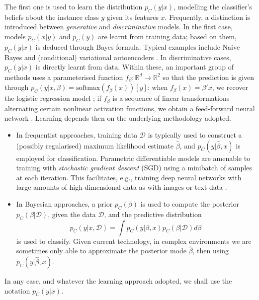 The first one is used to learn the distribution $p_C(y|x)$, modelling the classifier's beliefs about the  instance class $y$ given its features $x$. 
Frequently, a distinction is introduced 
between {\em generative} and {\em discriminative} models. %
   In the first case, models $p_C(x|y)$ and $p_C (y)$ are learnt from training data; based on them,
$p_C(y|x)$ is deduced through Bayes formula. Typical examples include 
Naive Bayes \cite{rish2001empirical} and (conditional) variational autoencoders %
 \cite{kingma2014semi}.
%
In discriminative cases, $p_C(y|x)$ is directly learnt from data.
Within these, an important group of methods uses  
a parameterised function
$f_\beta : \mathbb{R}^d \rightarrow \mathbb{R}^2 $
so that the prediction is given through 
$p_C(y|x,\beta) = \mbox{softmax} (f_\beta (x))[y]$: when $f_\beta (x) = \beta' x$, we recover the logistic regression
model 
\cite{mccullagh1989generalized}; 
if $f_\beta$ is  a sequence of linear transformations alternating certain nonlinear activation functions,   %
 we obtain a feed-forward neural network \cite{bishop2006pattern}. 
 Learning depends then on the underlying
methodology adopted.
%
\begin{itemize}
\item In frequentist approaches, training data $\mathcal{D}$ is 
typically used to construct a (possibly regularised) maximum likelihood estimate $\hat{\beta}$, and $p_C(y | \hat{ \beta }, x )$ is employed for classification. Parametric
differentiable models are amenable to training with \emph{stochastic gradient descent}
(SGD) \cite{bottou2008tradeoffs}  %
using a minibatch %
of samples at each iteration. 
This facilitates, e.g.,  training 
deep neural networks with large amounts of
high-dimensional data as 
with images or text data \cite{10.5555/3086952}.
\item In Bayesian approaches, a prior $p_C (\beta)$ is used to compute the posterior $p_C (\beta | \mathcal{D} )$, given the data $\mathcal{D}$, and the predictive distribution
\begin{equation}\label{MIERDA}
p_C (y | x, \mathcal{D})= \int p_C(y | \beta , x ) p_C (\beta | \mathcal{D} ) d\beta 
\end{equation} 
is used to classify. Given current technology,
in complex environments  
we are sometimes only able to approximate the posterior mode $\hat {\beta}$,
then using $p_C(y | \hat {\beta} , x )$.
\end{itemize}
In any case, and whatever the learning approach adopted, we shall use the notation $p_C (y |x)$. 

